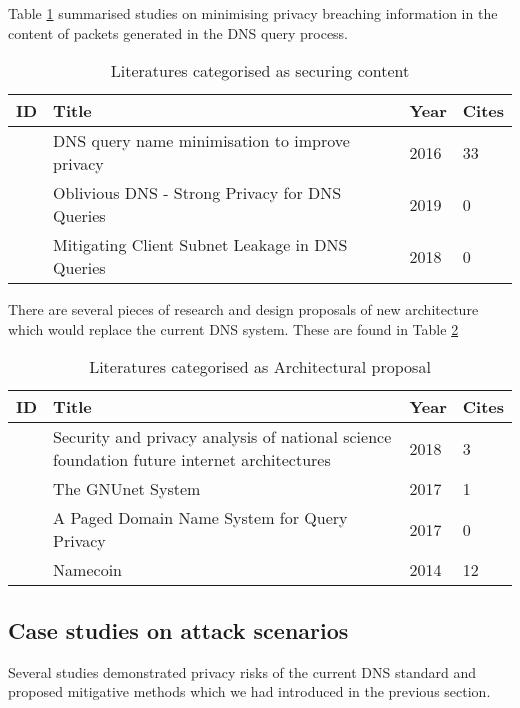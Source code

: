 Table \ref{content} summarised studies on minimising privacy breaching information in the content of packets generated in the DNS query process.

\begin{table}[h!]
    \begin{tabular}{ | l | p{10.5cm} | l | l |}
        \hline
            ID & Title & Year & Cites \\ \hline
            \cite{bortzmeyer2016dns} & DNS query name minimisation to improve privacy & 2016 & 33 \\ \hline
            \cite{annee-dprive-oblivious-dns-00} & Oblivious DNS - Strong Privacy for DNS Queries & 2019 & 0 \\ \hline
            \cite{pan2018mitigating} & Mitigating Client Subnet Leakage in DNS Queries & 2018 & 0 \\ \hline
        \end{tabular}
        \caption{Literatures categorised as securing content}
\label{content}
\end{table}

There are several pieces of research and design proposals of new architecture which would replace the current DNS system. These are found in Table \ref{architectures}

\begin{table}[h!]
    \begin{tabular}{ | l | p{10.5cm} | l | l | }
        \hline
            ID & Title & Year & Cites \\ \hline
            \cite{ambrosin2018security} & Security and privacy analysis of national science foundation future internet architectures & 2018 & 3 \\ \hline
            \cite{grothoff2017gnunet} & The GNUnet System & 2017 & 1 \\ \hline
            \cite{asoni2017paged} & A Paged Domain Name System for Query Privacy & 2017 & 0 \\ \hline
            \cite{loibl2014namecoin} & Namecoin & 2014 & 12 \\ \hline
        \end{tabular}
        \caption{Literatures categorised as Architectural proposal}
    \label{architectures}
\end{table}
\FloatBarrier
\subsection{Case studies on attack scenarios}
Several studies demonstrated privacy risks of the current DNS standard and proposed mitigative methods which we had introduced in the previous section. 

